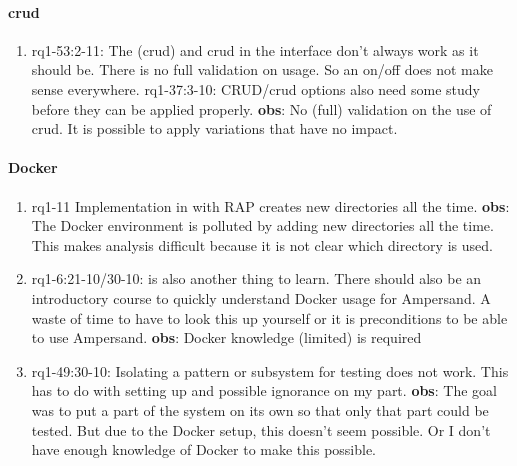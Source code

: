 \paragraph{\acrlong{crud}}
\begin{enumerate}
    \item rq1-53:2-11: The  (\acrlong{crud}) and \acrshort{crud} in the {interface} don't always work as it should be.
    There is no full validation on usage.
    So an on/off does not make sense everywhere.
    \newline rq1-37:3-10: CRUD/crud options also need some study before they can be applied properly.
    \newline\textbf{obs}: No (full) validation on the use of crud.
    It is possible to apply variations that have no impact.

\end{enumerate}

\paragraph{Docker}
\begin{enumerate}
    \item rq1-11 Implementation in  with RAP creates new directories all the time.
    \newline\textbf{obs}: The Docker environment is polluted by adding new directories all the time.
    This makes analysis difficult because it is not clear which directory is used.

    \item rq1-6:21-10/30-10:  is also another thing to learn.
    There should also be an introductory course to quickly understand Docker usage for Ampersand.
    A waste of time to have to look this up yourself or it is preconditions to be able to use Ampersand.
    \newline\textbf{obs}: Docker knowledge (limited) is required

    \item rq1-49:30-10: Isolating a {pattern} or subsystem for testing does not work.
    This has to do with setting up  and possible ignorance on my part.
    \newline\textbf{obs}: The goal was to put a part of the system on its own so that only that part could be tested.
    But due to the Docker setup, this doesn't seem possible.
    Or I don't have enough knowledge of Docker to make this possible.

\end{enumerate}

